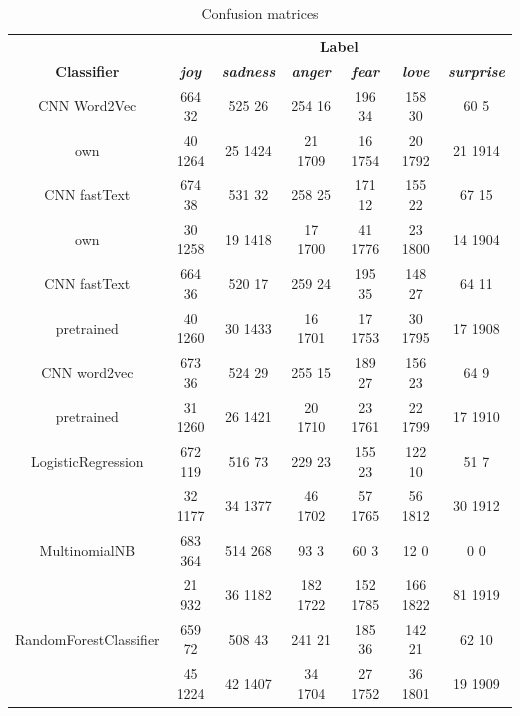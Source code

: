 \documentclass[conference]{IEEEtran}
\begin{document}
\begin{table}[htbp]
\caption{Confusion matrices}
\begin{center}
\begin{tabular}{|c|c|c|c|c|c|c|}
\hline
\textbf{}&\multicolumn{6}{|c|}{\textbf{Label}} \\ 
\cline{2-7}
\textbf{Classifier} & \textbf{\textit{joy}}& \textbf{\textit{sadness}}& \textbf{\textit{anger}}& \textbf{\textit{fear}}& \textbf{\textit{love}}& \textbf{\textit{surprise}} \\ 
\hline
CNN Word2Vec & 664    32 & 525    26 & 254    16 & 196    34 & 158    30 & 60    5 \\ 

own & 40    1264 & 25    1424 & 21    1709 & 16    1754 & 20    1792 & 21    1914 \\ 
\hline
CNN fastText & 674    38 & 531    32 & 258    25 & 171    12 & 155    22 & 67    15 \\ 

own & 30    1258 & 19    1418 & 17    1700 & 41    1776 & 23    1800 & 14    1904 \\ 
\hline
CNN fastText & 664    36 & 520    17 & 259    24 & 195    35 & 148    27 & 64    11 \\ 

pretrained & 40    1260 & 30    1433 & 16    1701 & 17    1753 & 30    1795 & 17    1908 \\ 
\hline
CNN word2vec & 673    36 & 524    29 & 255    15 & 189    27 & 156    23 & 64    9 \\ 

pretrained & 31    1260 & 26    1421 & 20    1710 & 23    1761 & 22    1799 & 17    1910 \\ 
\hline
LogisticRegression & 672    119 & 516    73 & 229    23 & 155    23 & 122    10 & 51    7 \\ 

 & 32    1177 & 34    1377 & 46    1702 & 57    1765 & 56    1812 & 30    1912 \\ 
\hline
MultinomialNB & 683    364 & 514    268 & 93    3 & 60    3 & 12    0 & 0    0 \\ 

 & 21    932 & 36    1182 & 182    1722 & 152    1785 & 166    1822 & 81    1919 \\ 
\hline
RandomForestClassifier & 659    72 & 508    43 & 241    21 & 185    36 & 142    21 & 62    10 \\ 

 & 45    1224 & 42    1407 & 34    1704 & 27    1752 & 36    1801 & 19    1909 \\ 
\hline
\end{tabular}
\label{tab2}
\end{center}
\end{table}
\end{document}
